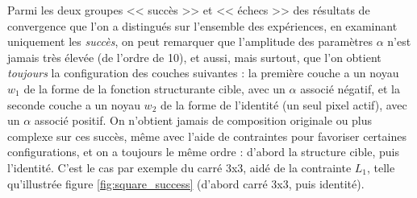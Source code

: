 \noindent Parmi les deux groupes << succès >> et << échecs >> des résultats de convergence que l'on a distingués sur l'ensemble des expériences, en examinant uniquement les \textit{succès}, on peut remarquer que l'amplitude des paramètres $\alpha$ n'est jamais très élevée (de l'ordre de 10), et aussi, mais surtout, que l'on obtient \textit{toujours} la configuration des couches suivantes : la première couche a un noyau $w_1$ de la forme de la fonction structurante cible, avec un $\alpha$ associé négatif, et la seconde couche a un noyau $w_2$ de la forme de l'identité (un seul pixel actif), avec un $\alpha$ associé positif. On n'obtient jamais de composition originale ou plus complexe sur ces succès, même avec l'aide de contraintes pour favoriser certaines configurations, et on a toujours le même ordre : d'abord la structure cible, puis l'identité. C'est le cas par exemple du carré 3x3, aidé de la contrainte $L_1$, telle qu'illustrée figure \ref{fig:square_success} (d'abord carré 3x3, puis identité).

\vspace{3.6mm}

